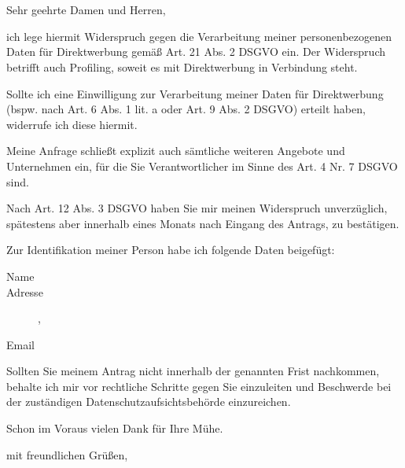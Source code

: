 \documentclass[a4paper, pagenumber=footmiddle, parskip=half,
	foldmarks=true,foldmarks=BmT, fromalign=right,
	fromphone=false, fromfax=false, fromemail=true, fromurl=false, fromlogo=false,
	fromrule=false, version=last]{scrlttr2}
\begin{document}
\begin{letter}{
	\EmpfaengerName\\
	\EmpfaengerStrasse\\
	\EmpfaengerStadt
}
\flushleft
\opening{Sehr geehrte Damen und Herren,}

ich lege hiermit Widerspruch gegen die Verarbeitung meiner personenbezogenen Daten für Direktwerbung gemäß Art. 21 Abs. 2 DSGVO ein. Der Widerspruch betrifft auch Profiling, soweit es mit Direktwerbung in Verbindung steht.

Sollte ich eine Einwilligung zur Verarbeitung meiner Daten für Direktwerbung (bspw. nach Art. 6 Abs. 1 lit. a oder Art. 9 Abs. 2 DSGVO) erteilt haben, widerrufe ich diese hiermit.

Meine Anfrage schließt explizit auch sämtliche weiteren Angebote und Unternehmen ein, für die Sie Verantwortlicher im Sinne des Art. 4 Nr. 7 DSGVO sind.

Nach Art. 12 Abs. 3 DSGVO haben Sie mir meinen Widerspruch unverzüglich, spätestens aber innerhalb eines Monats nach Eingang des Antrags, zu bestätigen.

\vspace*{15mm}
Zur Identifikation meiner Person habe ich folgende Daten beigefügt:
\begin{description}
	\item[Name] \meinName{}
	\item[Adresse] \meineStrasse{}, \meineStadt{}
	\item[Email] \meineEmail{}  
\end{description}
\vspace*{5mm}

Sollten Sie meinem Antrag nicht innerhalb der genannten Frist nachkommen, behalte ich mir vor rechtliche Schritte gegen Sie einzuleiten und Beschwerde bei der zuständigen Datenschutzaufsichtsbehörde einzureichen.

Schon im Voraus vielen Dank für Ihre Mühe.


\closing{mit freundlichen Grüßen,}


\end{letter}
\end{document}

